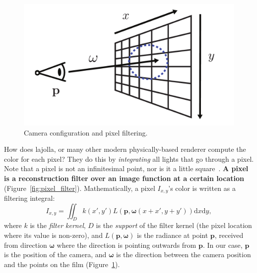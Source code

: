 \begin{figure}[h]
    \centering
    \includegraphics[width=0.4\linewidth]{imgs/camera.pdf}
    \caption{Camera configuration and pixel filtering.}
    \label{fig:camera}
\end{figure}

How does lajolla, or many other modern physically-based renderer compute the color for each pixel? They do this by \emph{integrating} all lights that go through a pixel. Note that a pixel is not an infinitesimal point, nor is it a little square~\cite{Smith:1995:PLS}. \textbf{A pixel is a reconstruction filter over an image function at a certain location} (Figure~\ref{fig:pixel_filter}). Mathematically, a pixel $I_{x, y}$'s color is written as a filtering integral:
\begin{equation}
    I_{x, y} = \iint_{D} k(x', y') L(\mathbf{p}, \mathbf{\omega}(x + x', y + y')) \mathrm{d}x\mathrm{d}y,
    \label{eq:pixel_filter}
\end{equation}
where $k$ is the \emph{filter kernel}, $D$ is the \emph{support} of the filter kernel (the pixel location where its value is non-zero), and $L(\mathbf{p}, \mathbf{\omega})$ is the radiance at point $\mathbf{p}$, received from direction $\mathbf{\omega}$ where the direction is pointing outwards from $\mathbf{p}$. In our case, $\mathbf{p}$ is the position of the camera, and $\mathbf{\omega}$ is the direction between the camera position and the points on the film (Figure~\ref{fig:camera}).

